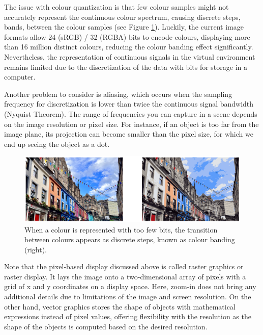 

The issue with colour quantization is that few colour samples might not accurately represent the continuous colour spectrum, causing discrete steps, bands, between the colour samples (see Figure \ref{fig:colour-band}). Luckily, the current image formats allow 24 (sRGB) / 32 (RGBA) bits to encode colours, displaying more than 16 million distinct colours, reducing the colour banding effect significantly. Nevertheless, the representation of continuous signals in the virtual environment remains limited due to the discretization of the data with bits for storage in a computer.

Another problem to consider is aliasing, which occurs when the sampling frequency for discretization is lower than twice the continuous signal bandwidth (Nyquist Theorem). The range of frequencies you can capture in a scene depends on the image resolution or pixel size. For instance, if an object is too far from the image plane, its projection can become smaller than the pixel size, for which we end up seeing the object as a dot.



\begin{figure}
  \centering
    \includegraphics[width=\linewidth]{Images/colour_quantization.png}

    \caption{When a colour is represented with too few bits, the transition between colours appears as discrete steps, known as colour banding (right).}\label{fig:colour-band}
\end{figure} 


Note that the pixel-based display discussed above is called raster graphics or raster display. It lays the image onto a two-dimensional array of pixels with a grid of x and y coordinates on a display space. Here, zoom-in does not bring any additional details due to limitations of the image and screen resolution. On the other hand, vector graphics stores the shape of objects with mathematical expressions instead of pixel values, offering flexibility with the resolution as the shape of the objects is computed based on the desired resolution.

